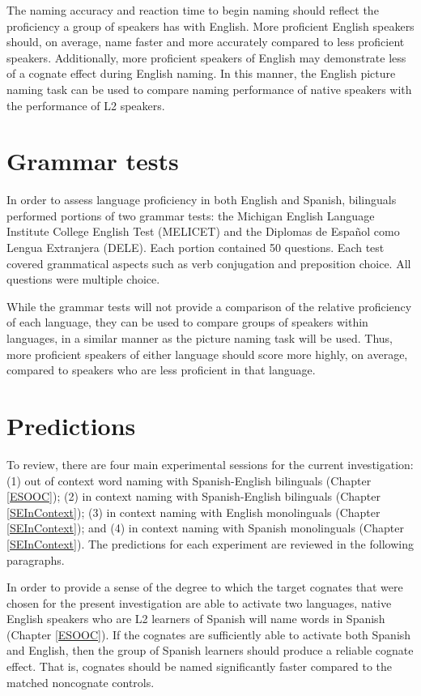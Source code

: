 The naming accuracy and reaction time to begin naming should reflect the proficiency a group of speakers has with English. More proficient English speakers should, on average, name faster and more accurately compared to less proficient speakers. Additionally, more proficient speakers of English may demonstrate less of a cognate effect during English naming. In this manner, the English picture naming task can be used to compare naming performance of native speakers with the performance of L2 speakers. 

\section{Grammar tests}
In order to assess language proficiency in both English and Spanish, bilinguals performed portions of two grammar tests: the Michigan English Language Institute College English Test (MELICET) and the Diplomas de Espa\~{n}ol como Lengua Extranjera (DELE). Each portion  contained 50 questions. Each test covered grammatical aspects such as verb conjugation and preposition choice. All questions were multiple choice. 

While the grammar tests will not provide a comparison of the relative proficiency of each language, they can be used to compare groups of speakers within languages, in a similar  manner as the picture naming task will be used. Thus, more proficient speakers of either language should score more highly, on average, compared to speakers who are less proficient in that language.

\section{Predictions}
To review, there are four main experimental sessions for the current investigation: (1) out of context word naming with Spanish-English bilinguals (Chapter \ref{ESOOC}); (2) in context naming with Spanish-English bilinguals (Chapter \ref{SEInContext}); (3) in context naming with English monolinguals (Chapter \ref{SEInContext}); and (4) in context naming with Spanish monolinguals (Chapter \ref{SEInContext}).  The predictions for each experiment are reviewed in the following paragraphs. 

In order to provide a sense of the degree to which the target cognates that were chosen for the present investigation are able to activate two languages, native English speakers who are L2 learners of Spanish will name words in Spanish (Chapter \ref{ESOOC}).  If the cognates are sufficiently able to activate both Spanish and English, then the group of Spanish learners  should produce a reliable cognate effect. That is, cognates should be named significantly faster compared to the matched noncognate controls. 

